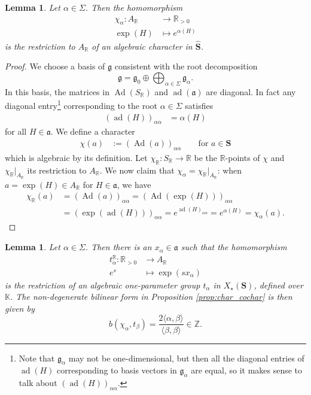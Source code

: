 \documentclass[12pt]{amsart}
\newcommand{\R}{\mathbb{R} }
\newcommand{\Z}{\mathbb{Z} }
\newcommand{\K}{\mathbb{K}}
\newcommand{\frakg}{\mathfrak{g}}
\newcommand{\fraka}{\mathfrak{a}}
\newcommand{\bS}{\mathbf{S}}
\numberwithin{equation}{section}
\newtheorem{lemma}[theorem]{Lemma}
\theoremstyle{remark} %
\begin{document}
\begin{lemma}\label{lem:char}
	Let $\alpha \in \Sigma$. Then the homomorphism
	\begin{align*}
		\chi_\alpha \colon A_\R & \to \R_{>0} \\
		\exp(H) &\mapsto e^{\alpha(H)}
	\end{align*}
	is the restriction to $A_\R$ of an algebraic character in $\hat{\bS}$. 
\end{lemma}
\begin{proof}
	We choose a basis of $\frakg$ consistent with the root decomposition
	$$
	\frakg = \frakg_0 \oplus \bigoplus_{\alpha \in \Sigma} \frakg_\alpha.
	$$
	In this basis, the matrices in $\operatorname{Ad}(S_\R)$ and $\operatorname{ad}(\fraka)$ are diagonal. In fact any diagonal entry\footnote{Note that $\frakg_\alpha$ may not be one-dimensional, but then all the diagonal entries of $\operatorname{ad}(H)$ corresponding to basis vectors in $\frakg_\alpha$ are equal, so it makes sense to talk about $(\operatorname{ad}(H))_{\alpha \alpha}$.} corresponding to the root $\alpha \in \Sigma$ satisfies
	\begin{align*}
		(	\operatorname{ad}(H))_{\alpha \alpha} & = \alpha(H)
	\end{align*}
	for all $H \in \fraka$. We define a character
	\begin{align*}
		\chi (a) &:= (\operatorname{Ad}(a) )_{\alpha \alpha} \quad \quad \text{for } a \in \bS
	\end{align*}
	which is algebraic by its definition. Let $\chi_\R \colon S_\R \to \R$ be the $\R$-points of $\chi$ and $\chi_\R|_{A_\R}$ its restriction to $A_\R$. We now claim that $\chi_\alpha = \chi_\R|_{A_{\R}}$: when $a = \exp(H) \in A_{\R}$ for $H \in \fraka$, we have 
	\begin{align*}
		\chi_\R (a) &= (\operatorname{Ad}(a))_{\alpha \alpha} 
		= (\operatorname{Ad}(\exp(H)))_{\alpha \alpha} \nonumber \\
		&= (\exp (\operatorname{ad}(H)))_{\alpha \alpha}
		= e^{\operatorname{ad}(H)_{\alpha \alpha}} = e^{\alpha(H)} = \chi_\alpha(a).
	\end{align*} 
\end{proof}
\begin{lemma}\label{lem:oneparam_compatibility}
	Let $\alpha \in \Sigma$. Then there is an $x_\alpha \in \fraka$ such that the homomorphism
	\begin{align*}
		t_\alpha^\R \colon \R_{>0} &\to A_\R \\
		e^s &\mapsto \exp(sx_\alpha)
	\end{align*}
	is the restriction of an algebraic one-parameter group $t_\alpha$ in $X_\star(\bS)$, defined over $\K$. The non-degenerate bilinear form in Proposition \ref{prop:char_cochar} is then given by
	$$
	b( \chi_\alpha, t_\beta ) = \frac{2\langle \alpha, \beta \rangle}{\langle \beta,\beta\rangle} \in \Z.
	$$
\end{lemma}
\end{document}
